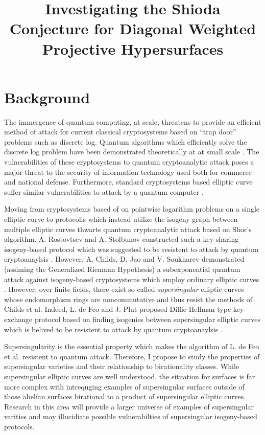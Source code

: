 \documentclass[12pt]{amsart}
\begin{document}
\thispagestyle{fancy}

\title{Investigating the Shioda Conjecture for Diagonal Weighted Projective Hypersurfaces}
\maketitle

\section*{Background}

The immergence of quantum computing, at scale, threatens to provide an efficient method of attack for current classical cryptosystems based on ``trap door'' problems such as discrete log. Quantum algorithms which efficiently solve the discrete log problem have been demonstrated theoretically at at small scale \cite{ekeraa2017quantum, Monz1068}. The vulnerabilities of these cryptosystems to quantum cryptoanalytic attack poses a major threat to the security of information technology used both for commerce and national defense. Furthermore, standard cryptosystems based elliptic curve suffer similar vulnerabilities to attack by a quantum computer \cite{proos2003shor}.

Moving from cryptosystems based of on pointwise logarithm problems on a single elliptic curve to protocolls which instead utilize the isogeny graph between multiple elliptic curves thwarts quantum cryptoanalytic attack based on Shor's algorithm. A. Rostovtsev and A. Stolbunov constructed such a key-sharing isogeny-based protocol which was suggested to be resistent to attack by quantum cryptoanaylsis \cite{rostovtsev2006public}. However, A. Childs, D. Jao and V. Soukharev demonstrated (assiming the Generalized Riemann Hypothesis) a subexponential quantum attack against isogeny-based cryptosystems which employ ordinary elliptic curves \cite{childs2014constructing}. However, over finite fields, there exist so called \textit{supersingular} elliptic curves whose endomorphism rings are noncommutative and thus resist the methods of Childs et al. Indeed, L. de Feo and J. Plut proposed Diffie-Hellman type key-exchange protocol based on finding isogenies between supersingular elliptic curves which is belived to be resistent to attack by quantum cryptoanaylsis \cite{feo_supersingular_isogeny_crypto}.

Supersingularity is the essential property which makes the algorithm of L. de Feo et al. resistent to quantum attack. Therefore, I propose to study the properties of supersingular varieties and their relationship to birationality classes. While supersingular elliptic curves are well understood, the situation for surfaces is far more complex with intrequging examples of supersingular surfaces outside of those abelian surfaces birational to a product of supersingular elliptic curves. Research in this area will provide a larger universe of examples of supersingular varities and may illucidiate possible vulnerabilties of supersingular isogeny-based protocols.
\end{document}
